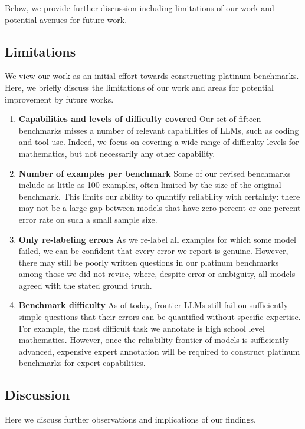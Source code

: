 

Below, we provide further discussion including limitations of our work and potential avenues for future work.

\subsection{Limitations} We view our work as an initial effort towards constructing platinum benchmarks. Here, we briefly discuss the limitations of our work and areas for potential improvement by future works.
\begin{enumerate}
    \item  \textbf{Capabilities and levels of difficulty covered } Our set of fifteen benchmarks misses a number of relevant capabilities of LLMs, such as coding and tool use. Indeed, we focus on covering a wide range of difficulty levels for mathematics, but not necessarily any other capability. %

    \item \textbf{Number of examples per benchmark } Some of our revised benchmarks include as little as 100 examples, often limited by the size of the original benchmark. This limits our ability to quantify reliability with certainty: there may not be a large gap between models that have zero percent or one percent error rate on such a small sample size.

    \item \textbf{Only re-labeling errors } As we re-label all examples for which some model failed, we can be confident that every error we report is genuine. However, there may still be poorly written questions in our platinum benchmarks among those we did not revise, where, despite error or ambiguity, all models agreed with the stated ground truth.

    \item \textbf{Benchmark difficulty } As of today, frontier LLMs still fail on sufficiently simple questions that their errors can be quantified without specific expertise. For example, the most difficult task we annotate is high school level mathematics. However, once the reliability frontier of models is sufficiently advanced, expensive expert annotation will be required to construct platinum benchmarks for expert capabilities.

\end{enumerate}



\subsection{Discussion}
Here we discuss further observations and implications of our findings.


